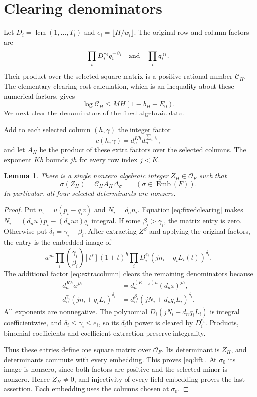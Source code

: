 \documentclass[11pt]{article}
\newcommand{\OO}{\mathcal O}
\newtheorem{lemma}[theorem]{Lemma}
\theoremstyle{remark}
\begin{document}
\section{Clearing denominators}
Let $D_i=\operatorname{lcm}(1,\ldots,T_i)$ and
$e_i=\lfloor H/w_i\rfloor$. The original row and column factors are
\[
\prod_iD_i^{e_i}q_i^{-\beta_i}
\quad\hbox{and}\quad \prod_iq_i^{\gamma_i}.
\]
Their product over the selected square matrix is a positive rational
number $\mathscr C_H$. The elementary clearing-cost calculation,
which is an inequality about these numerical factors, gives
\begin{equation}\label{eq:oldcost}
\log\mathscr C_H\le MH(1-b_H+E_0).
\end{equation}
We next clear the denominators of the fixed algebraic data.

Add to each selected column $(h,\gamma)$ the integer factor
\begin{equation}\label{eq:extracolumn}
c(h,\gamma)=d_a^{Kh}d_n^{\sum_i\gamma_i},
\end{equation}
and let $A_H$ be the product of these extra factors over the selected
columns. The exponent $Kh$ bounds $jh$ for every row index $j<K$.

\begin{lemma}\label{lem:lift}
There is a single nonzero algebraic integer $Z_H\in\OO_F$ such that
\begin{equation}\label{eq:lift}
\sigma(Z_H)=\mathscr C_H A_H\Delta_\sigma
\qquad(\sigma\in\operatorname{Emb}(F)).
\end{equation}
In particular, all four selected determinants are nonzero.
\end{lemma}
\begin{proof}
Put $n_i=u(p_i-q_iv)$ and $N_i=d_n n_i$. Equation
\eqref{eq:fixedclearing} makes $N_i=(d_nu)p_i-(d_nuv)q_i$ integral.
If some $\beta_i>\gamma_i$, the matrix entry is zero. Otherwise put
$\delta_i=\gamma_i-\beta_i$. After extracting $Z^\beta$ and applying
the original factors, the entry is the embedded image of
\[
a^{jh}\prod_i\binom{\gamma_i}{\beta_i}
[t^s](1+t)^h\prod_iD_i^{e_i}(jn_i+q_iL_i(t))^{\delta_i}.
\]
The additional factor \eqref{eq:extracolumn} clears the remaining
denominators because
\begin{align*}
d_a^{Kh}a^{jh}&=d_a^{(K-j)h}(d_aa)^{jh},\\
d_n^{\gamma_i}(jn_i+q_iL_i)^{\delta_i}
 &=d_n^{\beta_i}(jN_i+d_nq_iL_i)^{\delta_i}.
\end{align*}
All exponents are nonnegative. The polynomial
$D_i(jN_i+d_nq_iL_i)$ is integral coefficientwise, and
$\delta_i\le\gamma_i\le e_i$, so its $\delta_i$th power is cleared
by $D_i^{e_i}$. Products, binomial coefficients and coefficient
extraction preserve integrality.

Thus these entries define one square matrix over $\OO_F$. Its
determinant is $Z_H$, and determinants commute with every embedding.
This proves \eqref{eq:lift}. At $\sigma_0$ its image is nonzero,
since both factors are positive and the selected minor is nonzero.
Hence $Z_H\ne0$, and injectivity of every field embedding proves the
last assertion. Each embedding uses the columns chosen at $\sigma_0$.
\end{proof}
\end{document}
